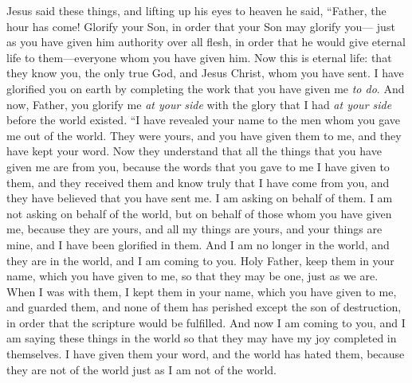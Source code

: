 \begin{biblechapter} %
 Jesus said these things, and lifting up his eyes to heaven he said, “Father, the hour has come! Glorify your Son, in order that your Son may glorify you—
\verse just as you have given him authority over all flesh, in order that he would give eternal life to them—everyone whom you have given him.
\verse Now this is eternal life: that they know you, the only true God, and Jesus Christ, whom you have sent.
\verse I have glorified you on earth by completing the work that you have given me \textit{to do}.
\verse And now, Father, you glorify me \textit{at your side} with the glory that I had \textit{at your side} before the world existed.
 “I have revealed your name to the men whom you gave me out of the world. They were yours, and you have given them to me, and they have kept your word.
\verse Now they understand that all the things that you have given me are from you,
\verse because the words that you gave to me I have given to them, and they received them and know truly that I have come from you, and they have believed that you have sent me.
\verse I am asking on behalf of them. I am not asking on behalf of the world, but on behalf of those whom you have given me, because they are yours,
\verse and all my things are yours, and your things are mine, and I have been glorified in them.
\verse And I am no longer in the world, and they are in the world, and I am coming to you. Holy Father, keep them in your name, which you have given to me, so that they may be one, just as we are.
\verse When I was with them, I kept them in your name, which you have given to me, and guarded them, and none of them has perished except the son of destruction, in order that the scripture would be fulfilled.
\verse And now I am coming to you, and I am saying these things in the world so that they may have my joy completed in themselves.
\verse I have given them your word, and the world has hated them, because they are not of the world just as I am not of the world.

\end{biblechapter}
